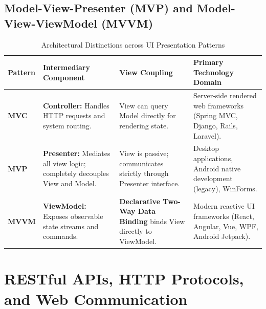 \subsection{Model-View-Presenter (MVP) and Model-View-ViewModel (MVVM)}
\begin{table}[htbp]
\centering
\small
\caption{Architectural Distinctions across UI Presentation Patterns}
\label{tab:mvc_mvp_mvvm}
\begin{tabularx}{\textwidth}{l p{3.8cm} p{3.8cm} X}
\toprule
\textbf{Pattern} & \textbf{Intermediary Component} & \textbf{View Coupling} & \textbf{Primary Technology Domain} \\
\midrule
\textbf{MVC} & \textbf{Controller:} Handles HTTP requests and system routing. & View can query Model directly for rendering state. & Server-side rendered web frameworks (Spring MVC, Django, Rails, Laravel). \\
\textbf{MVP} & \textbf{Presenter:} Mediates all view logic; completely decouples View and Model. & View is passive; communicates strictly through Presenter interface. & Desktop applications, Android native development (legacy), WinForms. \\
\textbf{MVVM} & \textbf{ViewModel:} Exposes observable state streams and commands. & \textbf{Declarative Two-Way Data Binding} binds View directly to ViewModel. & Modern reactive UI frameworks (React, Angular, Vue, WPF, Android Jetpack). \\
\bottomrule
\end{tabularx}
\end{table}

\section{RESTful APIs, HTTP Protocols, and Web Communication}
\label{sec:se_rest_apis}


